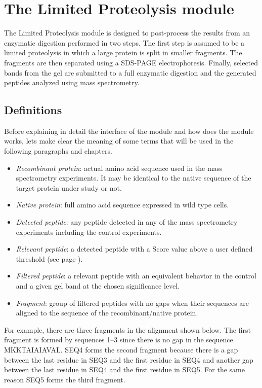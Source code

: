 \chapter{The Limited Proteolysis module}
\label{chap:limprot}

The Limited Proteolysis module is designed to post-process the results from an enzymatic digestion performed in two steps. The first step is assumed to be a limited proteolysis in which a large protein is split in smaller fragments. The fragments are then separated using a SDS-PAGE electrophoresis. Finally, selected bands from the gel are submitted to a full enzymatic digestion and the generated peptides analyzed using mass spectrometry.

\section{Definitions}

Before explaining in detail the interface of the module and how does the module works, lets make clear the meaning of some terms that will be used in the following paragraphs and chapters.

\begin{itemize}
	\item \textit{Recombinant protein}: actual amino acid sequence used in the mass spectrometry experiments. It may be identical to the native sequence of the target protein under study or not.
	\item \textit{Native protein}: full amino acid sequence expressed in wild type cells.
	\item \textit{Detected peptide}: any peptide detected in any of the mass spectrometry experiments including the control experiments.
	\item \textit{Relevant peptide}: a detected peptide with a Score value above a user defined threshold (see page \pageref{par:ScoreValue}).
	\item \textit{Filtered peptide}: a relevant peptide with an equivalent behavior in the control and a given gel band at the chosen significance level.\label{par:PIPLimprot}
	\item \textit{Fragment}: group of filtered peptides with no gaps when their sequences are aligned to the sequence of the recombinant/native protein. 
\end{itemize}

For example, there are three fragments in the alignment shown below. The first fragment is formed by sequences \numrange{1}{3} since there is no gap in the sequence MKKTAIAIAVAL. SEQ\num{4} forms the second fragment because there is a gap between the last residue in SEQ\num{3} and the first residue in SEQ\num{4} and another gap between the last residue in SEQ\num{4} and the first residue in SEQ\num{5}. For the same reason SEQ\num{5} forms the third fragment.

